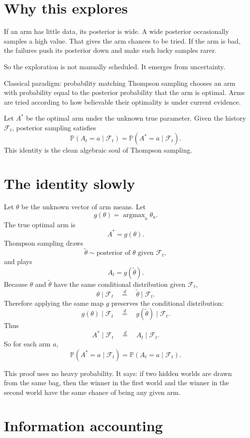 \documentclass[en,nofont,11pt]{elegantbook}
\newcommand{\Pp}{\mathbb{P}}
\newcommand{\calF}{\mathcal{F}}
\providecommand{\argmax}{\mathop{\mathrm{argmax}}}
\begin{document}
\section{Why this explores}

If an arm has little data, its posterior is wide. A wide posterior occasionally samples a high value. That gives the arm chances to be tried. If the arm is bad, the failures push its posterior down and make such lucky samples rarer.

So the exploration is not manually scheduled. It emerges from uncertainty.

\begin{researchbox}{Classical paradigm: probability matching}
Thompson sampling chooses an arm with probability equal to the posterior probability that the arm is optimal. Arms are tried according to how believable their optimality is under current evidence.
\end{researchbox}

Let $A^*$ be the optimal arm under the unknown true parameter. Given the history $\calF_t$, posterior sampling satisfies
\[
\Pp(A_t=a\mid\calF_t)
=\Pp(A^*=a\mid\calF_t).
\]
This identity is the clean algebraic soul of Thompson sampling.

\section{The identity slowly}

Let $\theta$ be the unknown vector of arm means. Let
\[
g(\theta)=\argmax_a \theta_a.
\]
The true optimal arm is
\[
A^*=g(\theta).
\]
Thompson sampling draws
\[
\widetilde\theta\sim \text{posterior of }\theta\text{ given }\calF_t,
\]
and plays
\[
A_t=g(\widetilde\theta).
\]
Because $\theta$ and $\widetilde\theta$ have the same conditional distribution given $\calF_t$,
\[
\theta\mid\calF_t
\quad\overset{d}{=}\quad
\widetilde\theta\mid\calF_t.
\]
Therefore applying the same map $g$ preserves the conditional distribution:
\[
g(\theta)\mid\calF_t
\quad\overset{d}{=}\quad
g(\widetilde\theta)\mid\calF_t.
\]
Thus
\[
A^*\mid\calF_t
\quad\overset{d}{=}\quad
A_t\mid\calF_t.
\]
So for each arm $a$,
\[
\Pp(A^*=a\mid\calF_t)=\Pp(A_t=a\mid\calF_t).
\]

This proof uses no heavy probability. It says: if two hidden worlds are drawn from the same bag, then the winner in the first world and the winner in the second world have the same chance of being any given arm.

\section{Information accounting}
\end{document}

